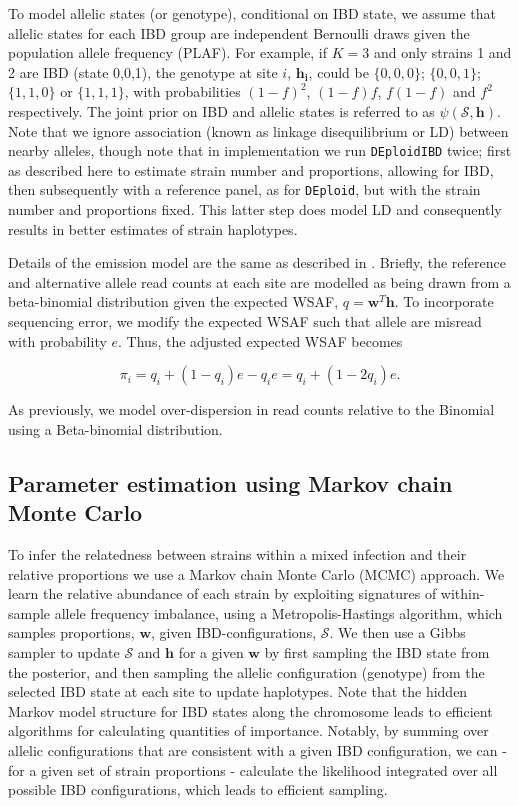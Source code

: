 \documentclass[9pt,lineno]{elife}
\begin{document}
\begin{appendixbox}
To model allelic states (or genotype), conditional on IBD state, we assume that allelic states for each IBD group are independent Bernoulli draws given the population allele frequency (PLAF).   For example, if $K=3$ and only strains 1 and 2 are IBD (state 0,0,1), the genotype at site $i$, $\mathbf{h_i}$, could be $\{0,0,0\}$; $\{0,0,1\}$; $\{1,1,0\}$ or $\{1,1,1\}$, with probabilities $(1-f)^2$, $(1-f)f$, $f(1-f)$ and $f^2$ respectively.   The joint prior on IBD and allelic states is referred to as $\psi(\mathcal{S},\mathbf{h})$.  Note that we ignore association (known as linkage disequilibrium or LD) between nearby alleles, though note that in implementation we run \texttt{DEploidIBD} twice; first as described here to estimate strain number and proportions, allowing for IBD, then subsequently with a reference panel, as for \texttt{DEploid}, but with the strain number and proportions fixed.  This latter step does model LD and consequently results in better estimates of strain haplotypes.

Details of the emission model are the same as described in \citet{Zhu2017}.  Briefly, the reference and alternative allele read counts at each site are modelled as being drawn from a beta-binomial distribution given the expected WSAF, $q = \mathbf{w}^T \mathbf{h}$.  To incorporate sequencing error, we modify the expected WSAF such that allele are misread with probability $e$. Thus, the adjusted expected WSAF becomes

\begin{equation} \label{eqn:adj_q}
\pi_i = q_i + (1 - q_i)e - q_ie = q_i + (1 - 2q_i)e.
\end{equation}

\noindent As previously, we model over-dispersion in read counts relative to the Binomial using a Beta-binomial distribution.


\subsection{Parameter estimation using Markov chain Monte Carlo}

To infer the relatedness between strains within a mixed infection and their relative proportions we use a Markov chain Monte Carlo (MCMC) approach. We learn the relative abundance of each strain by exploiting signatures of within-sample allele frequency imbalance, using a Metropolis-Hastings algorithm, which samples proportions, $\mathbf{w}$,  given IBD-configurations, $\mathcal{S}$. We then use a Gibbs sampler to update $\mathcal{S}$ and $\mathbf{h}$ for a given $\mathbf{w}$ by first sampling the IBD state from the posterior, and then sampling the allelic configuration (genotype) from the selected IBD state at each site to update haplotypes.  Note that the hidden Markov model structure for IBD states along the chromosome leads to efficient algorithms for calculating quantities of importance.  Notably, by summing over allelic configurations that are consistent with a given IBD configuration, we can - for a given set of strain proportions - calculate the likelihood integrated over all possible IBD configurations, which leads to efficient sampling.



\end{appendixbox}
\end{document}
